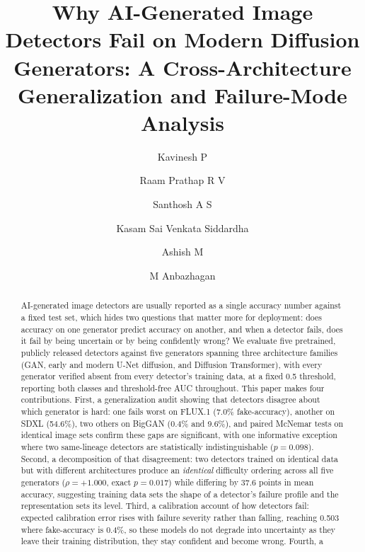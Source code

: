 \documentclass[3p,times,procedia]{elsarticle}
\begin{document}
\begin{frontmatter}


\title{Why AI-Generated Image Detectors Fail on Modern Diffusion Generators: A Cross-Architecture Generalization and Failure-Mode Analysis}

\author[a]{Kavinesh P}
\author[a]{Raam Prathap R V}
\author[a]{Santhosh A S}
\author[a]{Kasam Sai Venkata Siddardha}
\author[a]{Ashish M}
\author[a]{M Anbazhagan}

\address[a]{Department of Computer Science and Engineering, Amrita School of Computing, Coimbatore 641112, Amrita Vishwa Vidyapeetham, India}

\begin{abstract}
AI-generated image detectors are usually reported as a single accuracy
number against a fixed test set, which hides two questions that matter more
for deployment: does accuracy on one generator predict accuracy on another,
and when a detector fails, does it fail by being uncertain or by being
confidently wrong? We evaluate five pretrained, publicly released detectors
against five generators spanning three architecture families (GAN, early
and modern U-Net diffusion, and Diffusion Transformer), with every
generator verified absent from every detector's training data, at a fixed
0.5 threshold, reporting both classes and threshold-free AUC throughout.
This paper makes four contributions. First, a generalization audit showing
that detectors disagree about which generator is hard: one fails worst on
FLUX.1 (7.0\% fake-accuracy), another on SDXL (54.6\%), two others on
BigGAN (0.4\% and 9.6\%), and paired McNemar tests on identical image sets
confirm these gaps are significant, with one informative exception where
two same-lineage detectors are statistically indistinguishable
($p=0.098$). Second, a decomposition of that disagreement: two detectors
trained on identical data but with different architectures produce an
\emph{identical} difficulty ordering across all five generators
($\rho=+1.000$, exact $p=0.017$) while differing by 37.6 points in mean
accuracy, suggesting training data sets the shape of a detector's failure
profile and the representation sets its level. Third, a calibration
account of how detectors fail: expected calibration error rises with
failure severity rather than falling, reaching 0.503 where fake-accuracy is
0.4\%, so these models do not degrade into uncertainty as they leave their
training distribution, they stay confident and become wrong. Fourth, a

\end{abstract}
\end{frontmatter}
\end{document}
